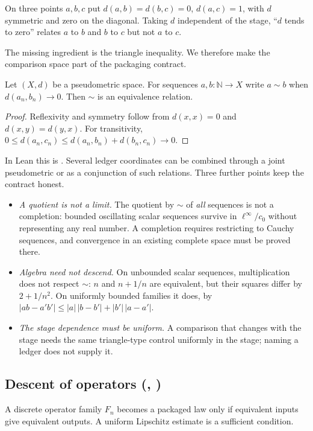 \begin{example}\label{ex:nontransitive}
On three points $a,b,c$ put $d(a,b)=d(b,c)=0$, $d(a,c)=1$, with $d$ symmetric and zero on the diagonal.
Taking $d$ independent of the stage, ``$d$ tends to zero'' relates $a$ to $b$ and $b$ to $c$ but not $a$ to $c$.
\end{example}

The missing ingredient is the triangle inequality.
We therefore make the comparison space part of the packaging contract.

\begin{proposition}\label{prop:packaging}
Let $(X,d)$ be a pseudometric space. For sequences $a,b:\mathbb N\to X$ write $a\sim b$ when $d(a_n,b_n)\to 0$. Then $\sim$ is an equivalence relation.
\end{proposition}

\begin{proof}
Reflexivity and symmetry follow from $d(x,x)=0$ and $d(x,y)=d(y,x)$. For transitivity, $0\le d(a_n,c_n)\le d(a_n,b_n)+d(b_n,c_n)\to 0$.
\end{proof}

\noindent In Lean this is .
Several ledger coordinates can be combined through a joint pseudometric or as a conjunction of such relations.
Three further points keep the contract honest.
\begin{itemize}
  \item \emph{A quotient is not a limit.} The quotient by $\sim$ of \emph{all} sequences is not a completion: bounded oscillating scalar sequences survive in $\ell^\infty/c_0$ without representing any real number. A completion requires restricting to Cauchy sequences, and convergence in an existing complete space must be proved there.
  \item \emph{Algebra need not descend.} On unbounded scalar sequences, multiplication does not respect $\sim$: $n$ and $n+1/n$ are equivalent, but their squares differ by $2+1/n^2$. On uniformly bounded families it does, by $|ab-a'b'|\le|a|\,|b-b'|+|b'|\,|a-a'|$.
  \item \emph{The stage dependence must be uniform.} A comparison that changes with the stage needs the same triangle-type control uniformly in the stage; naming a ledger does not supply it.
\end{itemize}

\subsection{Descent of operators (\Pone, \Ptwo)}
A discrete operator family $F_n$ becomes a packaged law only if equivalent inputs give equivalent outputs.
A uniform Lipschitz estimate is a sufficient condition.

